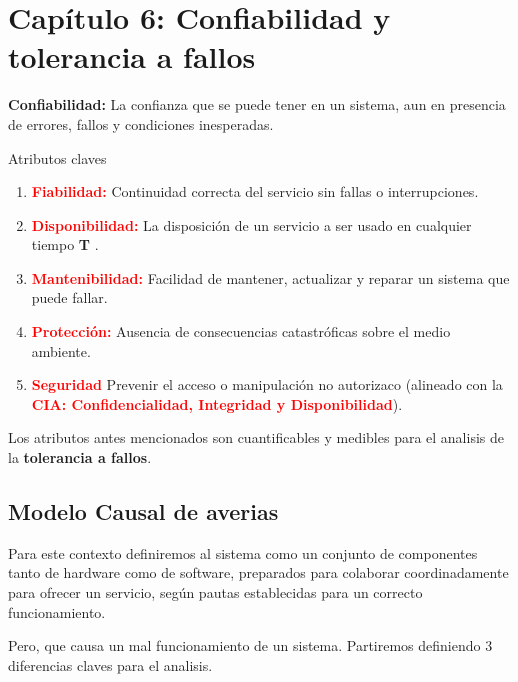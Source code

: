 \section{Capítulo 6: Confiabilidad y tolerancia a fallos}

\textbf{Confiabilidad:} La confianza que se puede tener en un sistema, aun en presencia de errores, fallos y condiciones inesperadas.

Atributos claves

\begin{enumerate}
    \item \textcolor{red}{\textbf{Fiabilidad:}} Continuidad correcta del servicio sin fallas o interrupciones.
    \item \textcolor{red}{\textbf{Disponibilidad:}} La disposición de un servicio a ser usado en cualquier tiempo \textbf{T} .
    \item \textcolor{red}{\textbf{Mantenibilidad:}} Facilidad de mantener, actualizar y reparar un sistema que puede fallar.
    \item \textcolor{red}{\textbf{Protección:}} Ausencia de consecuencias catastróficas sobre el medio ambiente.
    \item \textcolor{red}{\textbf{Seguridad}} Prevenir el acceso o manipulación no autorizaco (alineado con la \textcolor{red}{\textbf{CIA: Confidencialidad, Integridad y Disponibilidad}}).
\end{enumerate}

Los atributos antes mencionados son cuantificables y medibles para el analisis de la \textbf{tolerancia a fallos}.

\subsection{Modelo Causal de averias}
Para este contexto definiremos al sistema como un conjunto de componentes tanto de hardware como de software, preparados para colaborar coordinadamente para ofrecer un servicio, según pautas establecidas para un correcto funcionamiento.


Pero, que causa un mal funcionamiento de un sistema. Partiremos definiendo 3 diferencias claves para el analisis.


